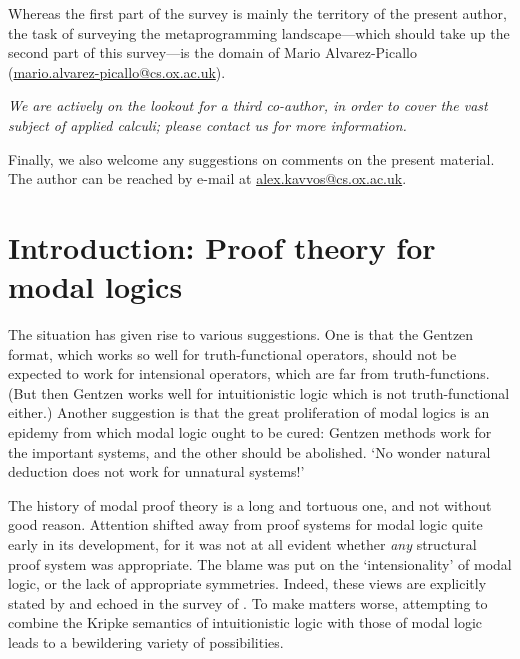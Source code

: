 \documentclass[a4paper]{amsart}
\begin{document}
Whereas the first part of the survey is mainly the territory of
the present author, the task of surveying the metaprogramming
landscape---which should take up the second part of this
survey---is the domain of Mario Alvarez-Picallo
(\href{mailto:mario.alvarez-picallo@cs.ox.ac.uk}{mario.alvarez-picallo@cs.ox.ac.uk}).

\emph{We are actively on the lookout for a third co-author, in
order to cover the vast subject of applied calculi; please contact
us for more information.}

Finally, we also welcome any suggestions on comments on the
present material. The author can be reached by e-mail at
\href{mailto:alex.kavvos@cs.ox.ac.uk}{alex.kavvos@cs.ox.ac.uk}.

\pagebreak

\section{Introduction: Proof theory for modal logics}

\textwidth
\epigraph{The situation has given rise to various suggestions. One
is that the Gentzen format, which works so well for
truth-functional operators, should not be expected to work for
intensional operators, which are far from truth-functions. (But
then Gentzen works well for intuitionistic logic which is not
truth-functional either.) Another suggestion is that the great
proliferation of modal logics is an epidemy from which modal logic
ought to be cured: Gentzen methods work for the important systems,
and the other should be abolished. `No wonder natural deduction
does not work for unnatural systems!'}{\cite{Bull1984}}

The history of modal proof theory is a long and tortuous one, and
not without good reason.  Attention shifted away from proof
systems for modal logic quite early in its development, for it was
not at all evident whether \emph{any} structural proof system was
appropriate. The blame was put on the `intensionality' of modal
logic, or the lack of appropriate symmetries. Indeed, these views
are explicitly stated by \cite{Bull1984} and echoed in the survey
of \cite{Negri2011}.  To make matters worse, attempting to combine
the Kripke semantics of intuitionistic logic with those of modal
logic leads to a bewildering variety of possibilities. 
\end{document}
